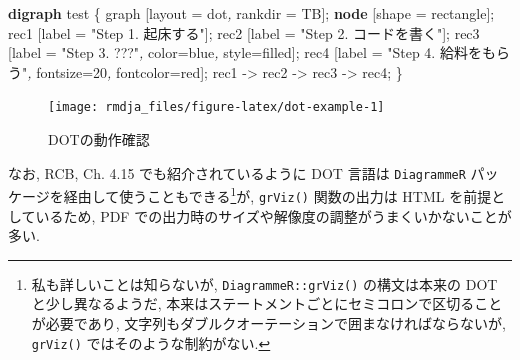 \documentclass[
]{bxjsbook}
\newenvironment{Shaded}{\begin{snugshade}}{\end{snugshade}}
\newcommand{\AttributeTok}[1]{\textcolor[rgb]{0.77,0.63,0.00}{#1}}
\newcommand{\CommentTok}[1]{\textcolor[rgb]{0.56,0.35,0.01}{\textit{#1}}}
\newcommand{\DecValTok}[1]{\textcolor[rgb]{0.00,0.00,0.81}{#1}}
\newcommand{\KeywordTok}[1]{\textcolor[rgb]{0.13,0.29,0.53}{\textbf{#1}}}
\newcommand{\OtherTok}[1]{\textcolor[rgb]{0.56,0.35,0.01}{#1}}
\newcommand{\StringTok}[1]{\textcolor[rgb]{0.31,0.60,0.02}{#1}}
\newcommand{\VariableTok}[1]{\textcolor[rgb]{0.00,0.00,0.00}{#1}}
\theoremstyle{definition}
\theoremstyle{definition}
\theoremstyle{definition}
\theoremstyle{remark}
\begin{document}
\begin{Shaded}
\begin{Highlighting}[numbers=left,,]
\KeywordTok{digraph} \VariableTok{test} \OtherTok{\{}
\CommentTok{  }\VariableTok{graph}\CommentTok{ }\OtherTok{[}\VariableTok{layout}\CommentTok{ }\OtherTok{=}\CommentTok{ }\VariableTok{dot}\CommentTok{, }\AttributeTok{rankdir}\CommentTok{ }\OtherTok{=}\CommentTok{ }\VariableTok{TB}\OtherTok{];}
\CommentTok{  }\KeywordTok{node}\CommentTok{ }\OtherTok{[}\AttributeTok{shape}\CommentTok{ }\OtherTok{=}\CommentTok{ }\VariableTok{rectangle}\OtherTok{];}
\CommentTok{  }\VariableTok{rec1}\CommentTok{ }\OtherTok{[}\AttributeTok{label}\CommentTok{ }\OtherTok{=}\CommentTok{ }\StringTok{"Step 1. 起床する"}\OtherTok{];}
\CommentTok{  }\VariableTok{rec2}\CommentTok{ }\OtherTok{[}\AttributeTok{label}\CommentTok{ }\OtherTok{=}\CommentTok{ }\StringTok{"Step 2. コードを書く"}\OtherTok{];}
\CommentTok{  }\VariableTok{rec3}\CommentTok{ }\OtherTok{[}\AttributeTok{label}\CommentTok{ }\OtherTok{=}\CommentTok{ }\StringTok{"Step 3. ???"}\CommentTok{, }\AttributeTok{color}\OtherTok{=}\VariableTok{blue}\CommentTok{, }\AttributeTok{style}\OtherTok{=}\VariableTok{filled}\OtherTok{];}
\CommentTok{  }\VariableTok{rec4}\CommentTok{ }\OtherTok{[}\AttributeTok{label}\CommentTok{ }\OtherTok{=}\CommentTok{ }\StringTok{"Step 4. 給料をもらう"}\CommentTok{, }\AttributeTok{fontsize}\OtherTok{=}\DecValTok{20}\CommentTok{, }\AttributeTok{fontcolor}\OtherTok{=}\VariableTok{red}\OtherTok{];}
\CommentTok{  }\VariableTok{rec1}\CommentTok{ }\OtherTok{{-}\textgreater{}}\CommentTok{ }\VariableTok{rec2}\CommentTok{ }\OtherTok{{-}\textgreater{}}\CommentTok{ }\VariableTok{rec3}\CommentTok{ }\OtherTok{{-}\textgreater{}}\CommentTok{ }\VariableTok{rec4}\OtherTok{;}
\CommentTok{  }\OtherTok{\}}
\end{Highlighting}
\end{Shaded}

\begin{figure}

{\centering \texttt{[image: rmdja\_files/figure-latex/dot-example-1]} 

}

\caption{DOTの動作確認}\label{fig:dot-example}
\end{figure}

なお, RCB, Ch. 4.15 でも紹介されているように DOT 言語は
\texttt{DiagrammeR} パッケージを経由して使うこともできる\footnote{私も詳しいことは知らないが,
  \texttt{DiagrammeR::grViz()} の構文は本来の DOT と少し異なるようだ,
  本来はステートメントごとにセミコロンで区切ることが必要であり,
  文字列もダブルクオーテーションで囲まなければならないが,
  \texttt{grViz()} ではそのような制約がない.}が, \texttt{grViz()}
関数の出力は HTML を前提としているため, PDF
での出力時のサイズや解像度の調整がうまくいかないことが多い.
\end{document}
